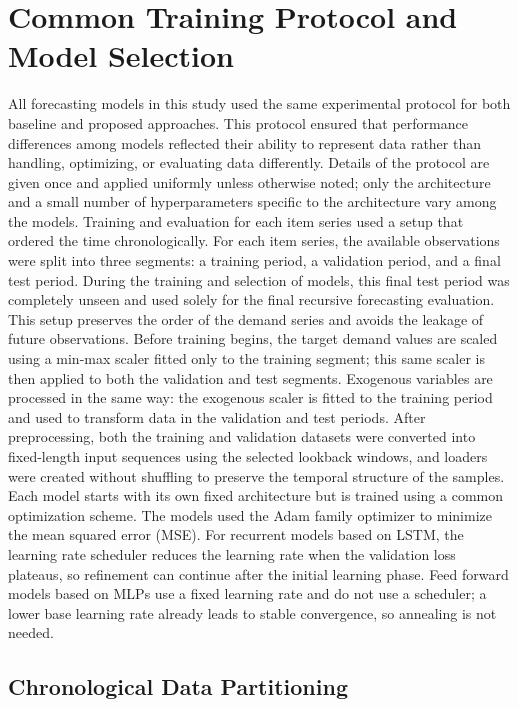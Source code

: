 \section{Common Training Protocol and Model Selection}
\label{subsec:training_strategies}
All forecasting models in this study used the same experimental protocol for both baseline and proposed approaches. This protocol ensured that performance differences among models reflected their ability to represent data rather than handling, optimizing, or evaluating data differently. Details of the protocol are given once and applied uniformly unless otherwise noted; only the architecture and a small number of hyperparameters specific to the architecture vary among the models. Training and evaluation for each item series used a setup that ordered the time chronologically. For each item series, the available observations were split into three segments: a training period, a validation period, and a final test period. During the training and selection of models, this final test period was completely unseen and used solely for the final recursive forecasting evaluation. This setup preserves the order of the demand series and avoids the leakage of future observations.
Before training begins, the target demand values are scaled using a min-max scaler fitted only to the training segment; this same scaler is then applied to both the validation and test segments. Exogenous variables are processed in the same way: the exogenous scaler is fitted to the training period and used to transform data in the validation and test periods. After preprocessing, both the training and validation datasets were converted into fixed-length input sequences using the selected lookback windows, and loaders were created without shuffling to preserve the temporal structure of the samples. Each model starts with its own fixed architecture but is trained using a common optimization scheme. The models used the Adam family optimizer to minimize the mean squared error (MSE). For recurrent models based on LSTM, the learning rate scheduler reduces the learning rate when the validation loss plateaus, so refinement can continue after the initial learning phase. Feed forward models based on MLPs use a fixed learning rate and do not use a scheduler; a lower base learning rate already leads to stable convergence, so annealing is not needed. 

\subsection{Chronological Data Partitioning}
\label{subsec:chronological_data_partitioning}

